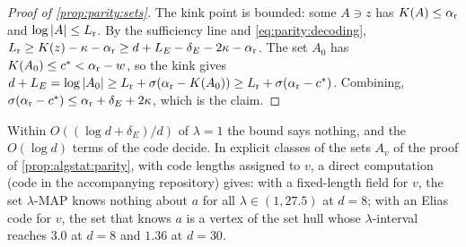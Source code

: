 \begin{proof}[Proof of \cref{prop:parity:sets}]
The kink point is bounded: some $A\ni z$ has $K(A)\le\alpha_{\rm r}$ and $\log|A|\le L_{\rm r}$. By the sufficiency line and \eqref{eq:parity:decoding}, $L_{\rm r}\ge K(z)-\kappa-\alpha_{\rm r}\ge d+L_E-\delta_E-2\kappa-\alpha_{\rm r}$. The set $A_0$ has $K(A_0)\le c^*<\alpha_{\rm r}-w$, so the kink gives $d+L_E=\log|A_0|\ge L_{\rm r}+\sigma(\alpha_{\rm r}-K(A_0))\ge L_{\rm r}+\sigma(\alpha_{\rm r}-c^*)$. Combining, $\sigma(\alpha_{\rm r}-c^*)\le\alpha_{\rm r}+\delta_E+2\kappa$, which is the claim.
\end{proof}

Within $O((\log d+\delta_E)/d)$ of $\lambda=1$ the bound says nothing, and the $O(\log d)$ terms of the code decide. In explicit classes of the sets $A_v$ of the proof of \cref{prop:algstat:parity}, with code lengths assigned to $v$, a direct computation (code in the accompanying repository) gives: with a fixed-length field for $v$, the set $\lambda$-MAP knows nothing about $a$ for all $\lambda\in(1,27.5)$ at $d=8$; with an Elias code for $v$, the set that knows $a$ is a vertex of the set hull whose $\lambda$-interval reaches $3.0$ at $d=8$ and $1.36$ at $d=30$.
